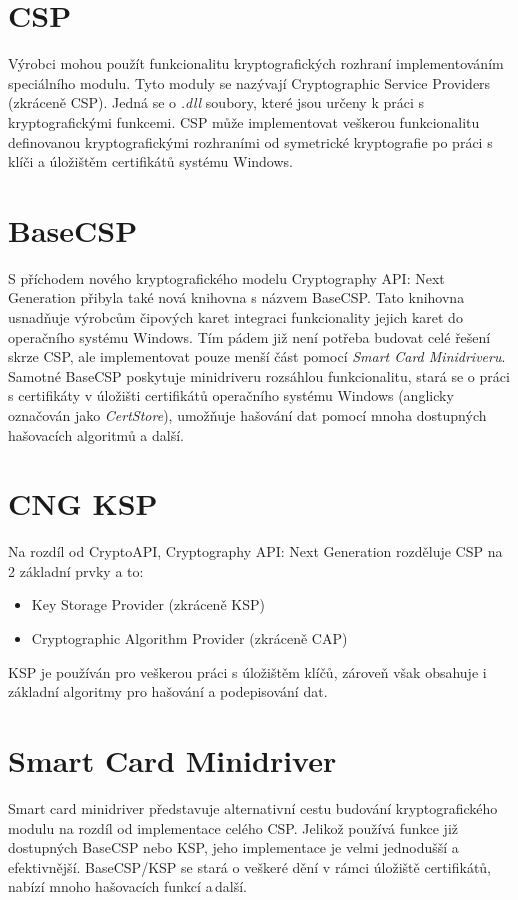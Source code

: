 \documentclass[]{fithesis3}
\begin{document}
	\section{CSP}
	
	Výrobci mohou použít funkcionalitu kryptografických rozhraní implementováním speciálního 			modulu. Tyto moduly se nazývají Cryptographic Service Providers (zkráceně CSP). Jedná se o 		\textit{.dll} soubory, které jsou určeny k práci s kryptografickými funkcemi. CSP může 				implementovat veškerou funkcionalitu definovanou kryptografickými rozhraními od symetrické 		kryptografie po práci s klíči a úložištěm certifikátů systému Windows.

	\section{BaseCSP}
	S příchodem nového kryptografického modelu Cryptography API: Next Generation přibyla také 		nová knihovna s názvem BaseCSP. Tato knihovna usnadňuje výrobcům čipových karet integraci 		funkcionality jejich karet do operačního systému Windows. Tím pádem již není potřeba budovat 		celé řešení skrze CSP, ale implementovat pouze menší část pomocí \textit{Smart Card 			Minidriveru}. Samotné BaseCSP poskytuje minidriveru rozsáhlou funkcionalitu, stará se o práci s 		certifikáty v úložišti certifikátů operačního systému Windows (anglicky označován jako 				\textit{CertStore}), umožňuje hašování dat pomocí mnoha dostupných hašovacích algoritmů a 		další.

	\section{CNG KSP}
	Na rozdíl od CryptoAPI, Cryptography API: Next Generation rozděluje CSP na 2 základní prvky a 	to:
	\begin{itemize}
	\item Key Storage Provider (zkráceně KSP)
	\item Cryptographic Algorithm Provider (zkráceně CAP)
	\end{itemize}
	KSP je používán pro veškerou práci s úložištěm klíčů, zároveň však obsahuje i základní 				algoritmy pro hašování a podepisování dat.

	\section{Smart Card Minidriver}
	Smart card minidriver představuje alternativní cestu budování kryptografického modulu na rozdíl od implementace celého CSP. Jelikož používá funkce již dostupných BaseCSP nebo KSP, jeho 			implementace je velmi jednodušší a efektivnější. BaseCSP/KSP se stará o veškeré dění v rámci 		úložiště certifikátů, nabízí mnoho hašovacích funkcí a\,další.  \newline
\end{document}
